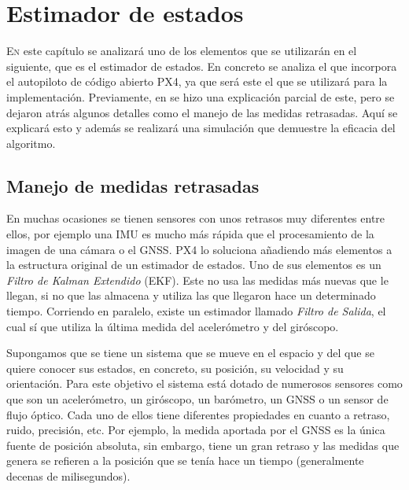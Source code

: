 \chapter{Estimador de estados}\label{chp:est}

\lettrine[lraise=-0.1, lines=2, loversize=0.2]{E}{n} este capítulo se analizará uno de los elementos que se utilizarán en el siguiente, que es el estimador de estados. En concreto se analiza el que incorpora el autopiloto de código abierto PX4, ya que será este el que se utilizará para la implementación. Previamente, en \cite{arias2019control} se hizo una explicación parcial de este, pero se dejaron atrás algunos detalles como el manejo de las medidas retrasadas. Aquí se explicará esto y además se realizará una simulación que demuestre la eficacia del algoritmo.

\section{Manejo de medidas retrasadas}
En muchas ocasiones se tienen sensores con unos retrasos muy diferentes entre ellos, por ejemplo una IMU es mucho más rápida que el procesamiento de la imagen de una cámara o el GNSS. PX4 lo soluciona añadiendo más elementos a la estructura original de un estimador de estados. Uno de sus elementos es un \textit{Filtro de Kalman Extendido} (EKF). Este no usa las medidas más nuevas que le llegan, si no que las almacena y utiliza las que llegaron hace un determinado tiempo. Corriendo en paralelo, existe un estimador llamado \textit{Filtro de Salida}, el cual sí que utiliza la última medida del acelerómetro y del giróscopo. 


Supongamos que se tiene un sistema que se mueve en el espacio y del que se quiere conocer sus estados, en concreto, su posición, su velocidad y su orientación. Para este objetivo el sistema está dotado de numerosos sensores como que son un acelerómetro, un giróscopo, un barómetro, un GNSS o un sensor de flujo óptico. Cada uno de ellos tiene diferentes propiedades en cuanto a retraso, ruido, precisión, etc. Por ejemplo, la medida aportada por el GNSS es la única fuente de posición absoluta, sin embargo, tiene un gran retraso y las medidas que genera se refieren a la posición que se tenía hace un tiempo (generalmente decenas de milisegundos). 

